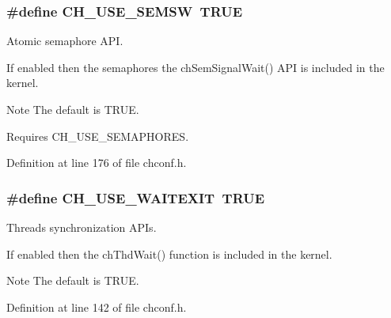 \subsubsection[{C\+H\+\_\+\+U\+S\+E\+\_\+\+S\+E\+M\+S\+W}]{\setlength{\rightskip}{0pt plus 5cm}\#define C\+H\+\_\+\+U\+S\+E\+\_\+\+S\+E\+M\+S\+W~T\+R\+U\+E}\label{group__config_gae9e6ff0fe1964761ea6e1bce51d8ee59}


Atomic semaphore A\+P\+I. 

If enabled then the semaphores the {\ttfamily ch\+Sem\+Signal\+Wait()} A\+P\+I is included in the kernel.

\begin{DoxyNote}{Note}
The default is {\ttfamily T\+R\+U\+E}. 

Requires {\ttfamily C\+H\+\_\+\+U\+S\+E\+\_\+\+S\+E\+M\+A\+P\+H\+O\+R\+E\+S}. 
\end{DoxyNote}


Definition at line 176 of file chconf.\+h.

\hypertarget{group__config_gac5e6308f66b8fdb57f0c849ed22b3d95}{}
\subsubsection[{C\+H\+\_\+\+U\+S\+E\+\_\+\+W\+A\+I\+T\+E\+X\+I\+T}]{\setlength{\rightskip}{0pt plus 5cm}\#define C\+H\+\_\+\+U\+S\+E\+\_\+\+W\+A\+I\+T\+E\+X\+I\+T~T\+R\+U\+E}\label{group__config_gac5e6308f66b8fdb57f0c849ed22b3d95}


Threads synchronization A\+P\+Is. 

If enabled then the {\ttfamily ch\+Thd\+Wait()} function is included in the kernel.

\begin{DoxyNote}{Note}
The default is {\ttfamily T\+R\+U\+E}. 
\end{DoxyNote}


Definition at line 142 of file chconf.\+h.

\hypertarget{group__config_gae52e2c3230a9e87d16befd547c2f92ef}{}
